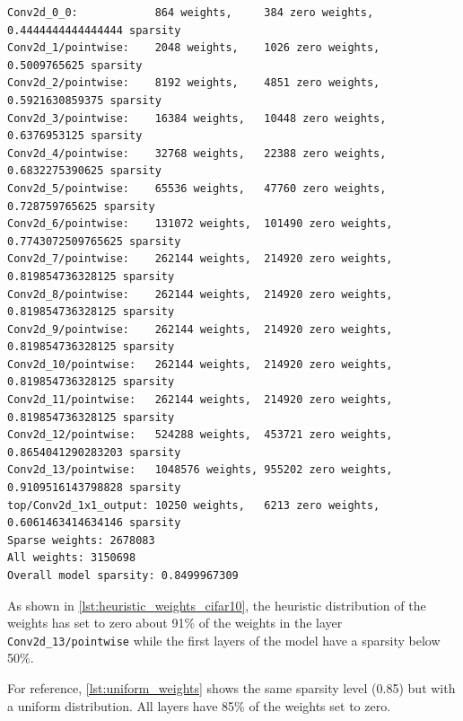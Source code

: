 \begin{lstlisting}[label={lst:heuristic_weights_cifar10},
    caption=MobileNet v1 and CIFAR-10: heuristic weights distributions]
Conv2d_0_0:            864 weights,     384 zero weights,    0.4444444444444444 sparsity
Conv2d_1/pointwise:    2048 weights,    1026 zero weights,   0.5009765625 sparsity
Conv2d_2/pointwise:    8192 weights,    4851 zero weights,   0.5921630859375 sparsity
Conv2d_3/pointwise:    16384 weights,   10448 zero weights,  0.6376953125 sparsity
Conv2d_4/pointwise:    32768 weights,   22388 zero weights,  0.6832275390625 sparsity
Conv2d_5/pointwise:    65536 weights,   47760 zero weights,  0.728759765625 sparsity
Conv2d_6/pointwise:    131072 weights,  101490 zero weights, 0.7743072509765625 sparsity
Conv2d_7/pointwise:    262144 weights,  214920 zero weights, 0.819854736328125 sparsity
Conv2d_8/pointwise:    262144 weights,  214920 zero weights, 0.819854736328125 sparsity
Conv2d_9/pointwise:    262144 weights,  214920 zero weights, 0.819854736328125 sparsity
Conv2d_10/pointwise:   262144 weights,  214920 zero weights, 0.819854736328125 sparsity
Conv2d_11/pointwise:   262144 weights,  214920 zero weights, 0.819854736328125 sparsity
Conv2d_12/pointwise:   524288 weights,  453721 zero weights, 0.8654041290283203 sparsity
Conv2d_13/pointwise:   1048576 weights, 955202 zero weights, 0.9109516143798828 sparsity
top/Conv2d_1x1_output: 10250 weights,   6213 zero weights,   0.6061463414634146 sparsity
Sparse weights: 2678083
All weights: 3150698
Overall model sparsity: 0.8499967309
\end{lstlisting}

As shown in \autoref{lst:heuristic_weights_cifar10}, the heuristic distribution
of the weights has set to zero about 91\% of the weights in the layer
\texttt{Conv2d\_13/pointwise} while the first layers of the model have a
sparsity below 50\%.

For reference, \autoref{lst:uniform_weights} shows the same sparsity level
(0.85) but with a uniform distribution. All layers have 85\% of the weights set
to zero.

